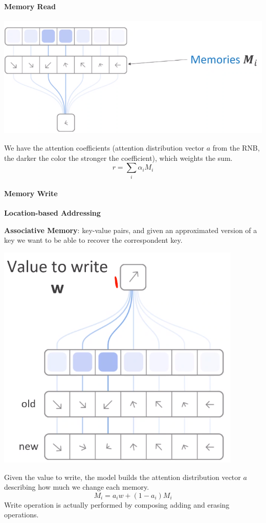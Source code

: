 \documentclass[10pt]{report}
\begin{document}
\paragraph{Memory Read}\begin{center}
	\includegraphics[scale=0.5]{133.png}
\end{center}
We have the attention coefficients (attention distribution vector $a$ from the RNB, the darker the color the stronger the coefficient), which weights the sum.
$$r = \sum_i \alpha_i M_i$$
\paragraph{Memory Write}\begin{list}{}{}
	\item \textbf{Location-based Addressing} %
	\item \textbf{Associative Memory}: key-value pairs, and given an approximated version of a key we want to be able to recover the correspondent key.
\end{list}
\begin{center}
	\includegraphics[scale=0.5]{134.png}
\end{center}
Given the value to write, the model builds the attention distribution vector $a$ describing how much we change each memory.
$$M_i = a_iw + (1-a_i)M_i$$
Write operation is actually performed by composing adding and erasing operations.
\end{document}
